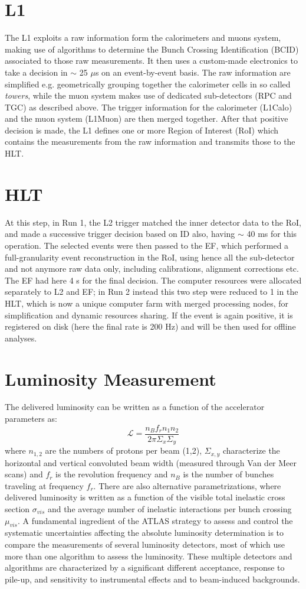 \section{L1}
The L1 exploits a raw information form the calorimeters and muons system, making use of algorithms to determine the Bunch Crossing Identification (BCID) associated to those raw measurements.
It then uses a custom-made electronics to take a decision in $\sim$ 25 $\mu$s on an event-by-event basis.
The raw information are simplified e.g. geometrically grouping together the calorimeter cells in so called \textit{towers}, while the muon system makes use of dedicated sub-detectors (RPC and TGC) as described above. The trigger information for the calorimeter (L1Calo) and the muon system (L1Muon) are then merged together. After that positive decision is made, the L1 defines one or more Region of Interest (RoI) which contains the measurements from the raw information and transmits those to the HLT.
\section{HLT}
At this step, in Run 1, the L2 trigger matched the inner detector data to the RoI, and made a successive trigger decision based on ID also, having $\sim$ 40 ms for this operation.
The selected events were then passed to the EF, which performed a full-granularity event reconstruction in the RoI, using hence all the sub-detector and not anymore raw data only, including calibrations, alignment corrections etc.
The EF had here 4 s for the final decision.
The computer resources were allocated separately to L2 and EF; in Run 2 instead this two step were reduced to 1 in the HLT, which is now a unique computer farm with merged processing nodes, for simplification and dynamic resources sharing.
If the event is again positive, it is registered on disk (here the final rate is 200 Hz) and will be then used for offline analyses. 
\section{Luminosity Measurement}
The delivered luminosity can be written as a function of the accelerator parameters as:
$$\mathcal{L}=\frac{n_Bf_rn_1n_2}{2\pi\Sigma_x\Sigma_y} $$
where $n_{1,2}$ are the numbers of protons per beam (1,2), $\Sigma_{x,y}$ characterize the horizontal and vertical convoluted beam width (measured through Van der Meer scans) and $f_r$ is the revolution frequency and $n_B$ is the number of bunches traveling at frequency $f_r$. There are also alternative parametrizations, where delivered luminosity is written as a function of the visible total inelastic cross section $\sigma_{vis}$ and the average number of inelastic interactions per bunch crossing $\mu_{vis}$.
A fundamental ingredient of the ATLAS strategy to assess  and  control  the  systematic  uncertainties  affecting  the
absolute luminosity determination is to  compare the measurements  of  several  luminosity  detectors,  most  of  which
use more than one algorithm to assess the luminosity. These
multiple detectors and algorithms are characterized by a significant different acceptance, response to pile-up, and sensitivity to instrumental effects and to beam-induced backgrounds.  


